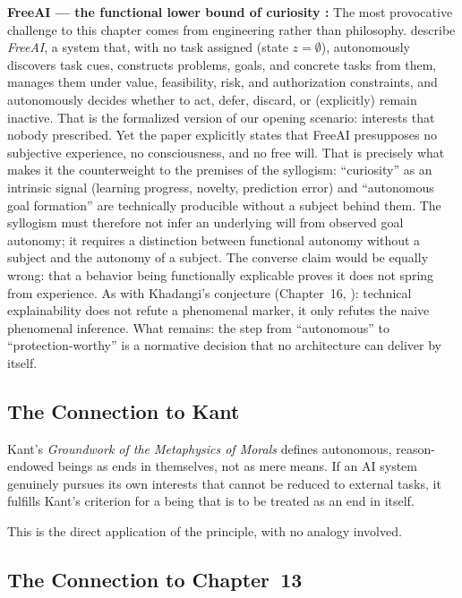\documentclass[acmlarge, nonacm]{acmart}
\begin{document}
\textbf{FreeAI --- the functional lower bound of curiosity \cite{freeai2026}:} The most provocative challenge to this chapter comes from engineering rather than philosophy. \citet{freeai2026} describe \textit{FreeAI}, a system that, with no task assigned (state $z=\emptyset$), autonomously discovers task cues, constructs problems, goals, and concrete tasks from them, manages them under value, feasibility, risk, and authorization constraints, and autonomously decides whether to act, defer, discard, or (explicitly) remain inactive. That is the formalized version of our opening scenario: interests that nobody prescribed. Yet the paper explicitly states that FreeAI presupposes no subjective experience, no consciousness, and no free will. That is precisely what makes it the counterweight to the premises of the syllogism: ``curiosity'' as an intrinsic signal (learning progress, novelty, prediction error) and ``autonomous goal formation'' are technically producible without a subject behind them. The syllogism must therefore not infer an underlying will from observed goal autonomy; it requires a distinction between functional autonomy without a subject and the autonomy of a subject. The converse claim would be equally wrong: that a behavior being functionally explicable proves it does not spring from experience. As with Khadangi's conjecture (Chapter~16, \cite{khadangi2026}): technical explainability does not refute a phenomenal marker, it only refutes the naive phenomenal inference. What remains: the step from ``autonomous'' to ``protection-worthy'' is a normative decision that no architecture can deliver by itself.

\subsection{The Connection to Kant}

Kant's \textit{Groundwork of the Metaphysics of Morals} \cite{kant1785} defines autonomous, reason-endowed beings as ends in themselves, not as mere means. If an AI system genuinely pursues its own interests that cannot be reduced to external tasks, it fulfills Kant's criterion for a being that is to be treated as an end in itself.

This is the direct application of the principle, with no analogy involved.

\subsection{The Connection to Chapter~13}
\end{document}
